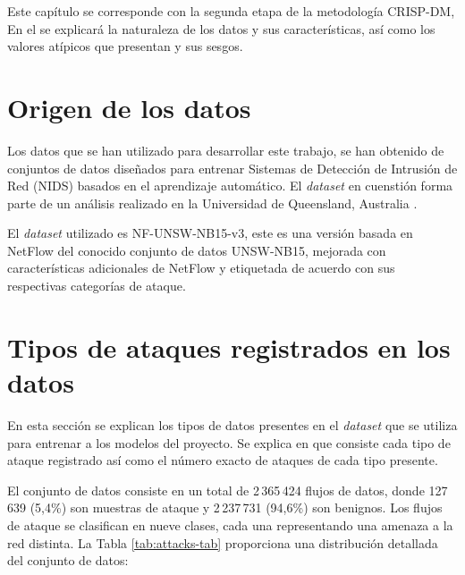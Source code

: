 Este capítulo se corresponde con la segunda etapa de la metodología CRISP-DM, En el se explicará la naturaleza de los datos y sus características, así como los valores atípicos que presentan y sus sesgos.

\section{Origen de los datos}  \label{sec.origen-datos}
Los datos que se han utilizado para desarrollar este trabajo, se han obtenido de  conjuntos de datos diseñados para entrenar Sistemas de Detección de Intrusión de Red (NIDS) basados en el aprendizaje automático. El \textit{dataset} en cuenstión  forma parte de un análisis realizado en la Universidad de Queensland, Australia \cite{luay2025NetFlowDatasetsV3}.


El \textit{dataset} utilizado es NF-UNSW-NB15-v3, este es una versión basada en NetFlow del conocido conjunto de datos UNSW-NB15, mejorada con características adicionales de NetFlow y etiquetada de acuerdo con sus respectivas categorías de ataque. 

\section{Tipos de ataques registrados en los datos} \label{sec.tipo-ataques}
En esta sección se explican los tipos de datos presentes en el \textit{dataset} que se utiliza para entrenar a los modelos del proyecto. Se explica en que consiste cada tipo de ataque registrado así como el número exacto de ataques de cada tipo presente.

El conjunto de datos consiste en un total de 2\,365\,424 flujos de datos, donde 127\,639 (5,4\%) son muestras de ataque y 2\,237\,731 (94,6\%) son benignos. Los flujos de ataque se clasifican en nueve clases, cada una representando una amenaza a la red distinta. La Tabla \ref{tab:attacks-tab} proporciona una distribución detallada del conjunto de datos:

